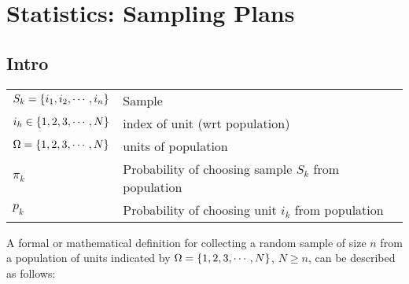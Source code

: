 \chapter{Statistics: Sampling Plans \cite{ism-1}}

\section*{Intro \cite{ism-1}}

\begin{longtable}{p{4cm} p{10cm}}
    $S_k = \left\{i_1,i_2,\cdots,i_n\right\}$ & Sample \\

    $i_h \in \left\{1, 2, 3,\cdots, N\right\}$ & index of unit (wrt population) \\

    $\Omega = \left\{1, 2, 3, \cdots, N\right\}$ & units of population \\

    $\pi_k$ & Probability of choosing sample $S_k$ from population\\

    $p_k$ & Probability of choosing unit $i_k$ from population\\
\end{longtable}

A formal or mathematical definition for collecting a random sample of size $n$ from a population of units indicated by $\Omega = \left\{1, 2, 3, \cdots, N\right\}$, $N \geq n$, can be described as follows:

